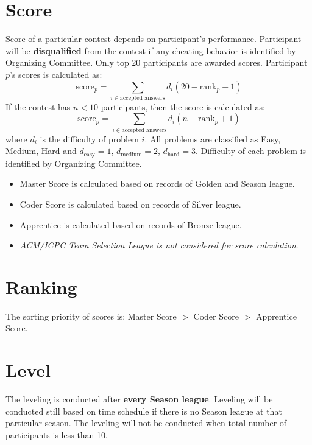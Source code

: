 \documentclass{article}
\begin{document}
\section{Score}

Score of a particular contest depends on participant's performance. Participant will be \textbf{disqualified} from the contest if any cheating behavior is identified by Organizing Committee. Only top 20 participants are awarded scores. Participant $p$'s scores is calculated as:
\begin{equation*}
	\text{score}_{p}=\sum_{i\in\text{accepted answers}}d_{i}(20-\text{rank}_{p}+1)
\end{equation*}
If the contest has $n<10$ participants, then the score is calculated as:
\begin{equation*}
	\text{score}_{p}=\sum_{i\in\text{accepted answers}}d_{i}(n-\text{rank}_{p}+1)
\end{equation*}
where $d_{i}$ is the difficulty of problem $i$. All problems are classified as Easy, Medium, Hard and $d_{\text{easy}}=1$, $d_{\text{medium}}=2$, $d_{\text{hard}}=3$. Difficulty of each problem is identified by Organizing Committee.

\begin{itemize}
	\item Master Score is calculated based on records of Golden and Season league.
	\item Coder Score is calculated based on records of Silver league.
	\item Apprentice is calculated based on records of Bronze league.
	\item \emph{ACM/ICPC Team Selection League is not considered for score calculation}.
\end{itemize}

\section{Ranking}

The sorting priority of scores is: Master Score $>$ Coder Score $>$ Apprentice Score.

\section{Level}

The leveling is conducted after \textbf{every Season league}. Leveling will be conducted still based on time schedule if there is no Season league at that particular season. The leveling will not be conducted when total number of participants is less than 10.
\end{document}
